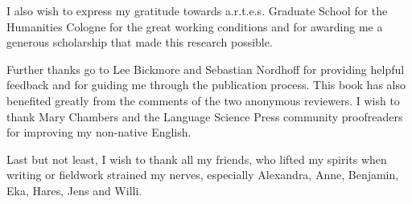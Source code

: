 \begin{refsection}
I also wish to express my gratitude towards a.r.t.e.s. Graduate School for the Humanities Cologne for the great working conditions and for awarding me a generous scholarship that made this research possible.

Further thanks go to Lee Bickmore and Sebastian Nordhoff for providing helpful feedback and for guiding me through the publication process. This book has also benefited greatly from the comments of the two anonymous reviewers. I wish to thank Mary Chambers and the Language Science Press community proofreaders for improving my non-native English.

Last but not least, I wish to thank all my friends, who lifted my spirits when writing or fieldwork strained my nerves, especially Alexandra, Anne, Benjamin, Eka, Hares, Jens and Willi.


\printbibliography[heading=subbibliography]
\end{refsection}